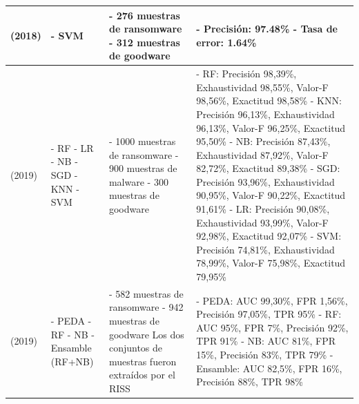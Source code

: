 {\begin{longtable}{|p{}|p{}|p{}|p{}|}
\cite{detectingSVM} (2018) & 
    - \gls{SVM} & 
    - 276 muestras de ransomware \newline - 312 muestras de goodware &
    - Precisión: 97.48\% \newline - Tasa de error: 1.64\% \\ \hline
\cite{detecting} (2019)    & 
    - \gls{RF} \newline - \gls{LR} \newline - \gls{NB} \newline - \gls{SGD} \newline - \gls{KNN} \newline - \gls{SVM} & 
    - 1000 muestras de ransomware \newline - 900 muestras de malware \newline - 300 muestras de goodware &
    - \gls{RF}: Precisión 98,39\%, Exhaustividad 98,55\%, Valor-F 98,56\%, Exactitud 98,58\% \newline - \gls{KNN}: Precisión 96,13\%, Exhaustividad 96,13\%, Valor-F 96,25\%, Exactitud 95,50\% \newline - \gls{NB}: Precisión 87,43\%, Exhaustividad 87,92\%, Valor-F 82,72\%, Exactitud 89,38\% \newline - \gls{SGD}: Precisión 93,96\%, Exhaustividad 90,95\%, Valor-F 90,22\%, Exactitud 91,61\% \newline - \gls{LR}: Precisión 90,08\%, Exhaustividad 93,99\%, Valor-F 92,98\%, Exactitud 92,07\% \newline - \gls{SVM}: Precisión 74,81\%, Exhaustividad 78,99\%, Valor-F 75,98\%, Exactitud 79,95\% \\ \hline
\cite{Kok2019} (2019)         & 
    - \gls{PEDA} \newline - \gls{RF} \newline - \gls{NB} \newline - Ensamble (\gls{RF}+\gls{NB}) & 
    - 582 muestras de ransomware \newline - 942 muestras de goodware \newline Los dos conjuntos de muestras fueron extraídos por el \gls{RISS} &
    - \gls{PEDA}: \gls{AUC} 99,30\%, \gls{FPR} 1,56\%, Precisión 97,05\%, \gls{TPR} 95\% \newline - \gls{RF}: \gls{AUC} 95\%, \gls{FPR} 7\%, Precisión 92\%, \gls{TPR} 91\% \newline - \gls{NB}: \gls{AUC} 81\%, \gls{FPR} 15\%, Precisión 83\%, \gls{TPR} 79\% \newline - Ensamble: \gls{AUC} 82,5\%, \gls{FPR} 16\%, Precisión 88\%, \gls{TPR} 98\% \\ \hline

\end{longtable}}
